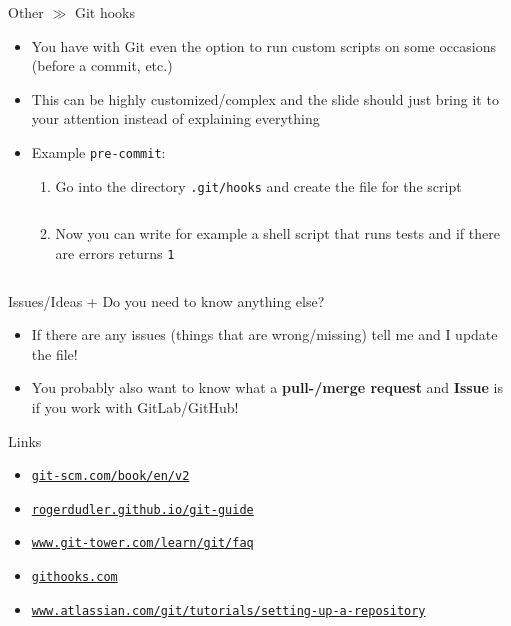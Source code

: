 \documentclass[10pt]{beamer}
\newcommand{\urlCustom}[1]{\href{https://#1}{\textcolor{greyCustom}{\texttt{#1}}}}
\begin{document}
\begin{frame}{Other $\gg$ Git hooks}
	\begin{itemize}
		\item You have with Git even the option to run custom scripts on some occasions (before a commit, etc.)
		\item This can be highly customized/complex and the slide should just bring it to your attention instead of explaining everything
		\item Example \texttt{pre-commit}:
		\begin{enumerate}
			\item Go into the directory \texttt{.git/hooks} and create the file for the script
			\inputminted[bgcolor=lightGreyCustom,fontsize=\scriptsize]{sh}{./resources/git_hooks_01_create.sh}
			\item Now you can write for example a shell script that runs tests and if there are errors returns \texttt{1}
			\inputminted[bgcolor=lightGreyCustom,fontsize=\scriptsize]{sh}{./resources/git_hooks_02_example.sh}
		\end{enumerate}
	\end{itemize}
\end{frame}

\begin{frame}{Issues/Ideas + Do you need to know anything else?}
	\begin{itemize}
		\item If there are any issues (things that are wrong/missing) tell me and I update the file!
		\item You probably also want to know what a \textbf{pull-/merge request} and \textbf{Issue} is if you work with GitLab/GitHub!
	\end{itemize}
\end{frame}

\begin{frame}{Links}
	\begin{itemize}
		\item\urlCustom{git-scm.com/book/en/v2}
		\item\urlCustom{rogerdudler.github.io/git-guide}
		\item\urlCustom{www.git-tower.com/learn/git/faq}
		\item\urlCustom{githooks.com}
		\item\urlCustom{www.atlassian.com/git/tutorials/setting-up-a-repository}
	\end{itemize}
	\begin{center}\doclicenseThis\end{center}
\end{frame}
\end{document}
